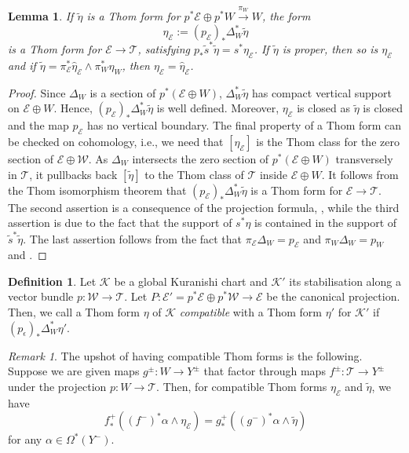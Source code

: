 \documentclass[11pt,psamsfonts, oneside, reqno]{amsart}
\newcommand{\cl}{\colon}
\newcommand{\cE}{\mathcal{E}}
\newcommand{\cK}{\mathcal{K}}
\newcommand{\cT}{\mathcal{T}}
\newcommand{\cW}{\mathcal{W}}
\newcommand{\wt}{\widetilde}
\newcommand{\wh}{\widehat}
\newcommand{\obs}{s}
\newtheorem{lemma}[theorem]{Lemma}
\theoremstyle{definition}
\newtheorem{definition}[theorem]{Definition}
\theoremstyle{remark}
\newtheorem{remark}[theorem]{Remark}
\numberwithin{equation}{section}
\begin{document}
\begin{lemma}
	\label{lem: from stabilisation to base}
	If $\widetilde{\eta}$ is a Thom form  for $p^*\cE \oplus p^*W \xrightarrow{\pi_W} W$,
	the form $$\eta_{\cE} := (p_\cE)_*\Delta_W^*\widetilde{\eta}$$\noindent is a Thom form for $\cE \rightarrow \cT$, satisfying $p_*\wt\obs^*\widetilde{\eta} = \obs^*\eta_\cE$. If $\wt\eta$ is proper, then so is $\eta_\cE$ and if $\wt\eta = \pi_\cE^*\wh\eta_\cE\wedge \pi_W^*\eta_W$, then $\eta_\cE = \wh\eta_\cE$.
\end{lemma}

\begin{proof}
	Since $\Delta_W$ is a section of $p^*(\cE\oplus W)$, $\Delta_W^*\widetilde{\eta}$ has compact vertical support on $\cE \oplus W$. Hence, $(p_\cE)_*\Delta_W^*\widetilde{\eta}$ is well defined. Moreover, $\eta_{\cE}$ is closed as $\widetilde{\eta}$ is closed and the map $p_\cE$ has no vertical boundary. The final property of a Thom form can be checked on cohomology, i.e., we need that $[\eta_\cE]$ is the Thom class for the zero section of $\cE\oplus\cW$. As $\Delta_W$ intersects the zero section of $p^*(\cE\oplus W)$ transversely in $\cT$, it pullbacks back $[\wt\eta]$ to the Thom class of $\cT$ inside $\cE\oplus W$. It follows from the Thom isomorphism theorem that $(p_\cE)_*\Delta_W^*\wt \eta$ is a Thom form for $\cE\to \cT$. The second assertion is a consequence of the projection formula, \cite[Proposition~2.1(4)]{ST16}, while the third assertion is due to the fact that the support of $\obs^*\eta$ is contained in the support of $\wt\obs^*\wt\eta$. The last assertion follows from the fact that $\pi_\cE\Delta_W= p_\cE$ and $\pi_W\Delta_W=  p_W$ and \cite[Proposition~2.1]{ST16}.
\end{proof}

\begin{definition}\label{de:compatible-thom-forms} Let $\cK$ be a global Kuranishi chart and $\cK'$ its stabilisation along a vector bundle $p \cl \cW\to \cT$. Let $P \cl \cE'= p^*\cE\oplus p^*\cW\to \cE$ be the canonical projection. Then, we call a Thom form $\eta$ of $\cK$ \emph{compatible} with a Thom form $\eta'$ for $\cK'$ if $(p_\epsilon)_*\Delta_W^*\eta'$.
\end{definition}

\begin{remark}\label{rem:compatible-thom-forms-consequence} The upshot of having compatible Thom forms is the following. Suppose we are given maps $g^{\pm}: W \rightarrow Y^{\pm}$ that factor through maps $f^{\pm}: \cT \rightarrow Y^{\pm}$ under the projection $p: W \rightarrow \cT$. Then, for  compatible Thom forms $\eta_{\cE}$ and $\wt \eta$, we have 
	\[
	f^+_*((f^-)^*\alpha \wedge \eta_{\cE}) = g^+_*((g^-)^*\alpha \wedge \wt \eta) \]
	for any $\alpha \in \Omega^*(Y^-)$.
\end{remark}
\end{document}
